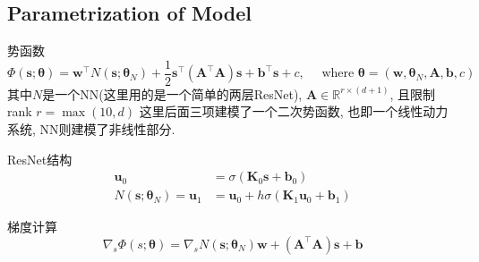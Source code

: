 \documentclass{article}
\begin{document}
\subsection{Parametrization of Model}

\begin{flushleft}
    势函数
    \begin{equation}
        \Phi(\boldsymbol{s} ; \boldsymbol{\theta})=\boldsymbol{w}^{\top} N\left(\boldsymbol{s} ; \boldsymbol{\theta}_{N}\right)+\frac{1}{2} \boldsymbol{s}^{\top}\left(\boldsymbol{A}^{\top} \boldsymbol{A}\right) \boldsymbol{s}+\boldsymbol{b}^{\top} \boldsymbol{s}+c, \quad \text { where } \boldsymbol{\theta}=\left(\boldsymbol{w}, \boldsymbol{\theta}_{N}, \boldsymbol{A}, \boldsymbol{b}, c\right)
    \end{equation}
    其中$N$是一个NN(这里用的是一个简单的两层ResNet), $\boldsymbol{A} \in \mathbb{R}^{r \times(d+1)}$, 且限制rank $r=\max(10, d)$
    这里后面三项建模了一个二次势函数, 也即一个线性动力系统, NN则建模了非线性部分.

    ResNet结构
    \begin{equation}
        \begin{aligned}
        \boldsymbol{u}_{0} &=\sigma\left(\boldsymbol{K}_{0} \boldsymbol{s}+\boldsymbol{b}_{0}\right) \\
        N\left(\boldsymbol{s} ; \boldsymbol{\theta}_{N}\right)=\boldsymbol{u}_{1} &=\boldsymbol{u}_{0}+h \sigma\left(\boldsymbol{K}_{1} \boldsymbol{u}_{0}+\boldsymbol{b}_{1}\right)
        \end{aligned}
    \end{equation}

    梯度计算
    \begin{equation}
        \nabla_{s} \Phi(s ; \boldsymbol{\theta})=\nabla_{s} N\left(\boldsymbol{s} ; \boldsymbol{\theta}_{N}\right) \boldsymbol{w}+\left(\boldsymbol{A}^{\top} \boldsymbol{A}\right) \boldsymbol{s}+\boldsymbol{b}
    \end{equation}


\end{flushleft}
\end{document}
